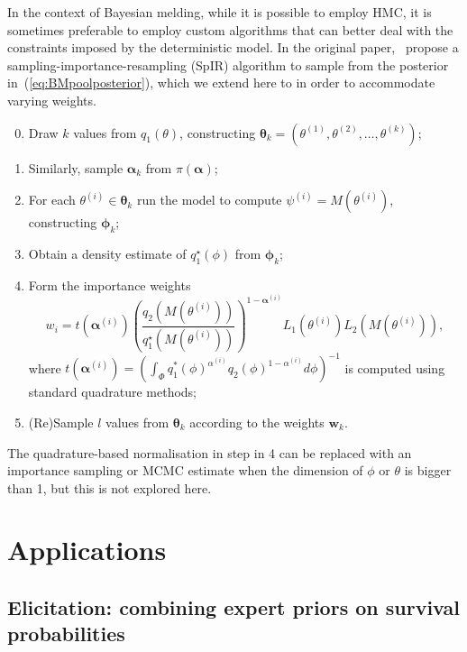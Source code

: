 \documentclass[a4paper, notitlepage, 10pt]{article}
\begin{document}
In the context of Bayesian melding, while it is possible to employ HMC, it is sometimes preferable to employ custom algorithms that can better deal with the constraints imposed by the deterministic model.
In the original paper,~\cite[sec. 3.4]{Poole2000} propose a sampling-importance-resampling (SpIR) algorithm to sample from the posterior in~(\ref{eq:BMpoolposterior}), which we extend here to in order to accommodate varying weights.
\begin{enumerate}
\setcounter{enumi}{-1}
 \item Draw $k$ values from  $q_1(\theta)$, constructing $\boldsymbol \theta_k = (\theta^{(1)}, \theta^{(2)}, \ldots, \theta^{(k)} )$;
 \item Similarly, sample $\boldsymbol \alpha_k$ from $\pi(\boldsymbol \alpha)$;
 \item For each $\theta^{(i)} \in \boldsymbol\theta_k$ run the model to compute $\psi^{(i)} = M(\theta^{(i)})$, constructing $\boldsymbol \phi_k$;
 \item Obtain a density estimate of $q_1^\star(\phi)$ from  $\boldsymbol \phi_k$;
 \item Form the importance weights 
 \begin{equation}
 \label{eq:SpIRweights}
  w_i = t\left(\boldsymbol \alpha^{(i)}\right) \left(\frac{q_2(M(\theta^{(i)}))}{q_1^\star(M(\theta^{(i)}))}\right)^{1 - \boldsymbol \alpha^{(i)}} L_1(\theta^{(i)}) L_2(M(\theta^{(i)})),
 \end{equation}
where $t\left(\boldsymbol \alpha^{(i)}\right) = \left( \int_{\Phi} q_1^\ast(\phi)^{\alpha^{(i)}} q_2(\phi)^{1-\alpha^{(i)}} d\phi \right)^{-1}$ is computed using standard quadrature methods;
 \item (Re)Sample $l$ values from $\boldsymbol \theta_k$ according to the weights $\boldsymbol w_k$.
\end{enumerate}
The quadrature-based normalisation in step in 4 can be replaced with an importance sampling or MCMC estimate when the dimension of $\phi$ or $\theta$ is bigger than 1, but this is not explored here.

\section{Applications}
\label{sec:apps}

\subsection{Elicitation: combining expert priors on survival probabilities}
\label{sec:survivalProbs}
\end{document}
